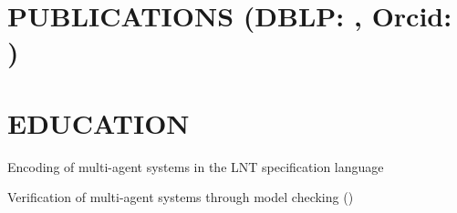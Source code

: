 \documentclass[a4paper]{deedy-resume-openfont}
\begin{document}
\hfill
\begin{minipage}[t]{0.67\textwidth} 

\section[Publications]{PUBLICATIONS \small{(DBLP: \href{https://dblp.org/pid/215/9758}{}, Orcid: \href{https://orcid.org/0000-0003-1922-3151}{})}}
\vspace{\topsep} %

\nocite{*}



\sectionsep


\section{EDUCATION}

\begin{tightemize}
    \item Encoding of multi-agent systems in the LNT specification language
    \item Verification of multi-agent systems through model checking (\href{https://cadp.inria.fr/}{})
\end{tightemize}
\sectionsep


\end{minipage}
\end{document}
